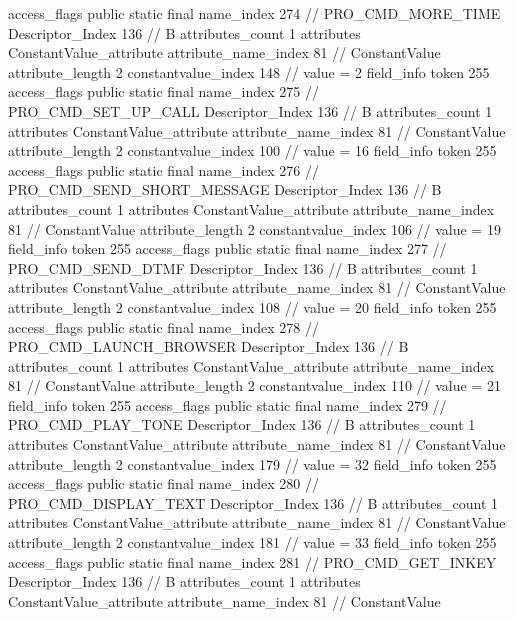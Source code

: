 {{{{{				access_flags	public static final
				name_index	274		// PRO_CMD_MORE_TIME
				Descriptor_Index	136		// B
				attributes_count	1
				attributes {
				ConstantValue_attribute {
					attribute_name_index	81		// ConstantValue
					attribute_length	2
					constantvalue_index	148		// value = 2
				}
				}
			}
			field_info {
				token	255
				access_flags	public static final
				name_index	275		// PRO_CMD_SET_UP_CALL
				Descriptor_Index	136		// B
				attributes_count	1
				attributes {
				ConstantValue_attribute {
					attribute_name_index	81		// ConstantValue
					attribute_length	2
					constantvalue_index	100		// value = 16
				}
				}
			}
			field_info {
				token	255
				access_flags	public static final
				name_index	276		// PRO_CMD_SEND_SHORT_MESSAGE
				Descriptor_Index	136		// B
				attributes_count	1
				attributes {
				ConstantValue_attribute {
					attribute_name_index	81		// ConstantValue
					attribute_length	2
					constantvalue_index	106		// value = 19
				}
				}
			}
			field_info {
				token	255
				access_flags	public static final
				name_index	277		// PRO_CMD_SEND_DTMF
				Descriptor_Index	136		// B
				attributes_count	1
				attributes {
				ConstantValue_attribute {
					attribute_name_index	81		// ConstantValue
					attribute_length	2
					constantvalue_index	108		// value = 20
				}
				}
			}
			field_info {
				token	255
				access_flags	public static final
				name_index	278		// PRO_CMD_LAUNCH_BROWSER
				Descriptor_Index	136		// B
				attributes_count	1
				attributes {
				ConstantValue_attribute {
					attribute_name_index	81		// ConstantValue
					attribute_length	2
					constantvalue_index	110		// value = 21
				}
				}
			}
			field_info {
				token	255
				access_flags	public static final
				name_index	279		// PRO_CMD_PLAY_TONE
				Descriptor_Index	136		// B
				attributes_count	1
				attributes {
				ConstantValue_attribute {
					attribute_name_index	81		// ConstantValue
					attribute_length	2
					constantvalue_index	179		// value = 32
				}
				}
			}
			field_info {
				token	255
				access_flags	public static final
				name_index	280		// PRO_CMD_DISPLAY_TEXT
				Descriptor_Index	136		// B
				attributes_count	1
				attributes {
				ConstantValue_attribute {
					attribute_name_index	81		// ConstantValue
					attribute_length	2
					constantvalue_index	181		// value = 33
				}
				}
			}
			field_info {
				token	255
				access_flags	public static final
				name_index	281		// PRO_CMD_GET_INKEY
				Descriptor_Index	136		// B
				attributes_count	1
				attributes {
				ConstantValue_attribute {
					attribute_name_index	81		// ConstantValue
}}}}}}}
